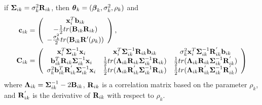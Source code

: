 \begin{theorem}
if $\boldsymbol\Sigma_{ik}=\sigma_{k}^{2}\mathbf R_{ik}$, then $\boldsymbol\theta_{k}=(\boldsymbol\beta_{k},\sigma^{2}_{k},\rho_{k})$ and
\begin{align*}
\mathbf c_{ik}&=\left( \begin{array}{c}\mathbf x_{i}^{T}\mathbf b_{ik}\\ -\frac{1}{2}tr( \mathbf B_{ik} \mathbf R_{ik})\\ -\frac{\sigma^{2}_{k}}{2}tr( \mathbf B_{ik} \mathbf R'(\rho_{k}))\end{array}\right),\\
\mathbf C_{ik}&=\left(\begin{array}{ccc} \mathbf x_{i}^{T}\boldsymbol\Sigma_{ik}^{-1}\mathbf x_{i}& \mathbf x_{i}^{T}\boldsymbol\Sigma_{ik}^{-1}\mathbf R_{ik}\mathbf b_{ik}&\sigma^{2}_{k}\mathbf x_{i}^{T} \boldsymbol\Sigma_{ik}^{-1}\mathbf R^{'}_{ik}\mathbf b_{ik}\\  
\mathbf b^{T}_{ik}\mathbf R_{ik}\boldsymbol\Sigma_{ik}^{-1}\mathbf x_{i}&\frac{1}{2}tr(\boldsymbol \Lambda_{ik}\mathbf R_{ik}\boldsymbol\Sigma_{ik}^{-1}\mathbf R_{ik})&\frac{1}{2}tr(\boldsymbol \Lambda_{ik}\mathbf R_{ik}\boldsymbol\Sigma_{ik}^{-1}\mathbf R^{'}_{ik})\\ 
\sigma^{2}_{k}\mathbf b_{ik}^{T}\mathbf R^{'}_{ik} \boldsymbol\Sigma_{ik}^{-1}\mathbf x_{i}&\frac{1}{2}tr(\boldsymbol \Lambda_{ik}\mathbf R^{'}_{ik}\boldsymbol\Sigma_{ik}^{-1}\mathbf R_{ik})&\frac{1}{2}tr(\boldsymbol \Lambda_{ik}\mathbf R^{'}_{ik}\boldsymbol\Sigma_{ik}^{-1}\mathbf R^{'}_{ik})
\end{array} \right)
\end{align*}
where $\boldsymbol \Lambda_{ik} = \boldsymbol\Sigma_{ik}^{-1}-2\mathbf B_{ik}$, $\mathbf R_{ik}$ is a correlation matrix based on the parameter $\rho_{k}$, and $\mathbf R^{'}_{ik}$ is the derivative of $\mathbf R_{ik}$ with respect to $\rho_{k}$. \\


\end{theorem}
